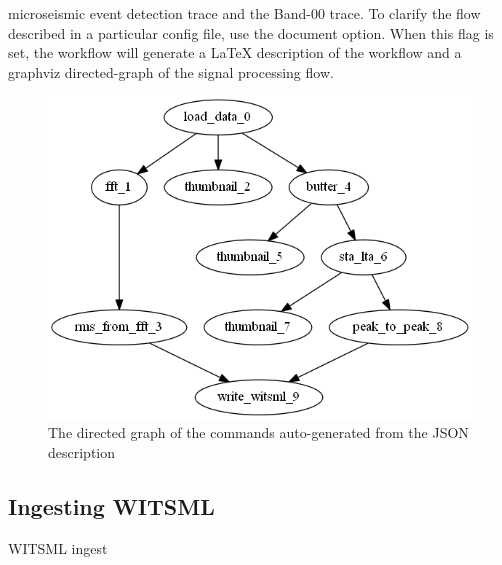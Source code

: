 microseismic event detection trace and the Band-00 trace.
To clarify the flow described in a particular config file, use the document option. When this flag is set, the workflow will generate 
a LaTeX description of the workflow and a graphviz directed-graph of the signal processing flow.
\begin{figure}
\includegraphics[width=\linewidth]{example_dot.png}
\caption{The directed graph of the commands auto-generated from the JSON description}
\label{fig:graph1}
\end{figure}

\subsection{Ingesting WITSML}
WITSML ingest
